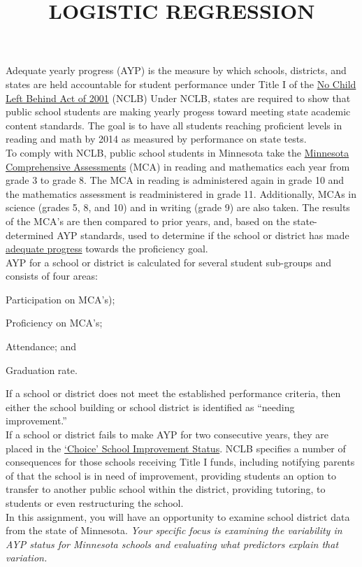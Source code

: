 \documentclass[]{article}
\title{LOGISTIC REGRESSION}
\author{}
\date{}
\begin{document}
\maketitle 
\thispagestyle{fancy}

\noindent Adequate yearly progress (AYP) is the measure by which schools, districts, and states are held accountable for student performance under Title I of the \href{http://www2.ed.gov/nclb/landing.jhtml}{No Child Left Behind Act of 2001} (NCLB) Under NCLB, states are required to show that public school students are making yearly progess toward meeting state academic content standards. The goal is to have all students reaching proficient levels in reading and math by 2014 as measured by performance on state tests. 
\\
\linebreak
To comply with NCLB, public school students in Minnesota take the \href{http://education.state.mn.us/mde/justparent/testreq/index.html}{Minnesota Comprehensive Assessments} (MCA) in reading and mathematics each year from grade 3 to grade 8. The MCA in reading is administered again in grade 10 and the mathematics assessment is readministered in grade 11. Additionally, MCAs in science (grades 5, 8, and 10) and in writing (grade 9) are also taken. The results of the MCA's are then compared to prior years, and, based on the state-determined AYP standards, used to determine if the school or district has made \href{http://en.wikipedia.org/wiki/Adequate_Yearly_Progress}{adequate progress} towards the proficiency goal.
\\
\linebreak
AYP for a school or district is calculated for several student sub-groups and consists of four areas: \begin{inparaenum}[(1)] \item Participation on MCA's); \item Proficiency on MCA's; \item Attendance; and \item Graduation rate.\end{inparaenum} If a school or district does not meet the established performance criteria, then either the school building or school district is identified as ``needing improvement.''
\\
\linebreak
If a school or district fails to make AYP for two consecutive years, they are placed in the \href{http://en.wikipedia.org/wiki/Adequate_Yearly_Progress#Unsuccessful_progress}{`Choice' School Improvement Status}. NCLB specifies a number of consequences for those schools receiving Title I funds, including notifying parents of that the school is in need of improvement, providing students an option to transfer to another public school within the district, providing tutoring, to students or even restructuring the school.
\\
\linebreak
In this assignment, you will have an opportunity to examine school district data from the state of Minnesota. \textit{Your specific focus is examining the variability in AYP status for Minnesota schools and evaluating what predictors explain that variation.}
\end{document}
